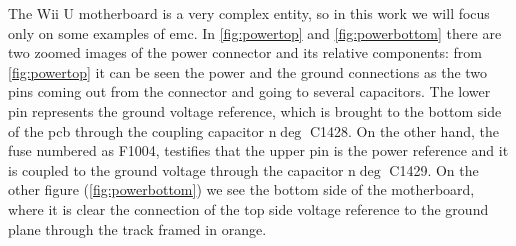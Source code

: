 \documentclass[11pt,a4paper,titlepage]{article}
\begin{document}
		  The Wii U motherboard is a very complex entity, so in this work we will focus only on some examples of \gls{emc}. In \autoref{fig:powertop} and \autoref{fig:powerbottom} there are two zoomed images of the power connector and its relative components: from \autoref{fig:powertop} it can be seen the power and the ground connections as the two pins coming out from the connector and going to several capacitors. The lower pin represents the ground voltage reference, which is brought to the bottom side of the \gls{pcb} through the coupling capacitor n$\deg$ C1428. On the other hand, the fuse numbered as F1004, testifies that the upper pin is the power reference and it is coupled to the ground voltage through the capacitor n$\deg$ C1429. On the other figure (\autoref{fig:powerbottom}) we see the bottom side of the motherboard, where it is clear the connection of the top side voltage reference to the ground plane through the track framed in orange.
\end{document}
